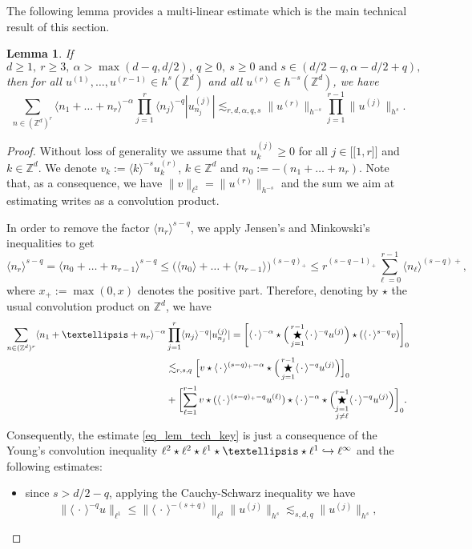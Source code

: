 \documentclass[11pt]{article}
\newcommand\hto{\mathrel{\lhook\joinrel\to}}
\newcommand{\llbracket}{\mathopen{[\!\![}}
\newcommand{\rrbracket}{\mathclose{]\!\!]}}
\newtheorem{lemma}[theorem]{Lemma}
\theoremstyle{definition}
\begin{document}
The following lemma provides a multi-linear estimate which is the main technical result of this section.
\begin{lemma} \label{lem_tech_key} If
\[
d\geq 1,\ r\geq 3,\ \alpha >\max(d-q,d/2),\ q\geq 0,\ s\geq 0\text{ and }s \in (d/2-q, \alpha-d/2+q),
\]
then for all $u^{(1)},\dots, u^{(r-1)} \in h^s(\mathbb{Z}^d)$ and all $u^{(r)} \in h^{-s}(\mathbb{Z}^d)$, we have
\begin{equation}
\label{eq_lem_tech_key}
\sum_{n\in (\mathbb{Z}^d)^r} \langle n_1 + \dots + n_r \rangle^{-\alpha} \prod_{j=1}^r \langle n_j \rangle^{-q} |u^{(j)}_{n_j}| \lesssim_{r,d,\alpha,q,s} \| u^{(r)} \|_{h^{-s}} \prod_{j=1}^{r-1}\| u^{(j)} \|_{h^{s}}.
\end{equation}
\end{lemma}
\begin{proof}Without loss of generality we assume that $u^{(j)}_k \geq 0$ for all $j\in \llbracket 1,r \rrbracket$ and $k\in \mathbb{Z}^d$. We denote $v_k:= \langle k\rangle^{-s} u^{(r)}_k$, $k\in \mathbb{Z}^d$ and $n_{0}:= -(n_1+\dots+n_r)$. Note that, as a consequence, we have $\|v\|_{\ell^2} = \| u^{(r)}\|_{h^{-s}}$ and the sum we aim at estimating writes as a convolution product.

In order to remove the factor $\langle n_r \rangle^{s-q}$, we apply Jensen's and Minkowski's inequalities to get
\[
\langle n_r \rangle^{s-q} = \langle n_0 + \dots + n_{r-1} \rangle^{s-q} \leq \big(\langle n_0 \rangle+ \dots + \langle n_{r-1} \rangle \big) ^{(s-q)_+} \leq r^{(s-q-1)_+} \sum_{\ell =0}^{r-1} \langle n_{\ell} \rangle^{(s-q)+},
\]
where $x_+:= \max(0,x)$ denotes the positive part. Therefore, denoting by $\star$ the usual convolution product on $\mathbb{Z}^d$, we have
\begin{align*}
\sum_{n\in (\mathbb{Z}^d)^r} \langle n_1 + \dots + n_r \rangle^{-\alpha}& \prod_{j=1}^r \langle n_j \rangle^{-q} |u^{(j)}_{n_j}| = \biggl[\langle \, \cdot \, \rangle^{-\alpha} \star \Big(\mathop{\bigstar}_{j=1}^{r-1} \langle \, \cdot \, \rangle^{-q} u^{(j)} \Big) \star (\langle \, \cdot \, \rangle^{s-q} v)\biggr]_0 \\
&\lesssim_{r,s,q} \Bigl[v\star \langle \, \cdot \, \rangle^{(s-q)_+-\alpha} \star \Big(\mathop{\bigstar}_{j=1}^{r-1} \langle \, \cdot \, \rangle^{-q} u^{(j)} \Big)\Bigl]_0 \\
& + \biggl[\sum_{\ell=1}^{r-1} v\star (\langle \, \cdot\,\rangle^{(s-q)_+-q} u^{(\ell)}) \star \langle \, \cdot \, \rangle^{-\alpha} \star \Bigl(\mathop{\bigstar}_{\substack{j=1 \\ j\neq \ell}}^{r-1} \langle \, \cdot \, \rangle^{-q} u^{(j)} \Bigr) \biggr]_0.
\end{align*}
Consequently, the estimate \eqref{eq_lem_tech_key} is just a consequence of the Young's convolution inequality $\ell^2 \star \ell^2 \star \ell^1 \star \dots \star \ell^1 \hto \ell^\infty$ and the following estimates:
\begin{itemize}
\item
since $s > d/2-q$, applying the Cauchy-Schwarz inequality we have
\[
\| \langle \, \cdot \, \rangle^{-q} u \|_{\ell^1} \leq \| \langle \, \cdot \, \rangle^{-(s+q)} \|_{\ell^2} \| u^{(j)} \|_{h^s}\lesssim_{s,d,q}\| u^{(j)} \|_{h^s},
\]


\end{itemize}
\end{proof}
\end{document}
